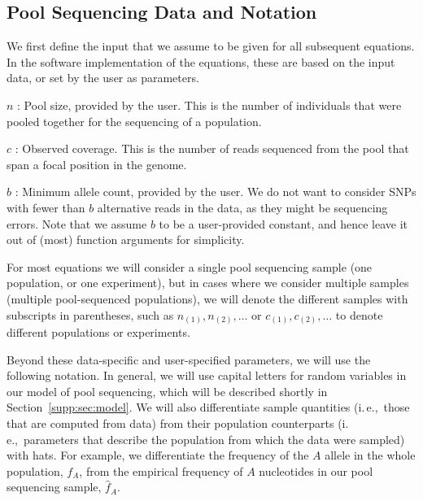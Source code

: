 \documentclass[letterpaper,fontsize=9pt,DIV=12]{scrartcl}
\newcounter{todo}
\newcommand\todo[1]{}
\newcommand\secref[1]{Section~\ref{#1}}
\newcommand{\samplesize}{n}
\newcommand{\coverage}{c}
\newcommand{\empfreq}{\widehat{f}}
\newcommand{\ie}{i.\,e.,~}
\begin{document}
\subsection{Pool Sequencing Data and Notation}
\label{supp:sec:Definitions:sub:PoolSequencing}

We first define the input that we assume to be given for all subsequent equations.
In the software implementation of the equations, these are based on the input data, or set by the user as parameters.

$\samplesize$ :
Pool size, provided by the user. This is the number of individuals that were pooled together for the sequencing of a population.

$\coverage$ :
Observed coverage. This is the number of reads sequenced from the pool that span a focal position in the genome. 

$b$ :
Minimum allele count, provided by the user.
We do not want to consider SNPs with fewer than $b$ alternative reads in the data, as they might be sequencing errors.
Note that we assume $b$ to be a user-provided constant,
and hence leave it out of (most) function arguments for simplicity.

For most equations we will consider a single pool sequencing sample (one population, or one experiment), but in cases where we consider multiple samples (multiple pool-sequenced populations), we will denote the different samples with subscripts in parentheses, such as $\samplesize_{(1)}, \samplesize_{(2)},\ldots$ or $\coverage_{(1)}, \coverage_{(2)}, \ldots$ to denote different populations or experiments.

Beyond these data-specific and user-specified parameters, we will use the following notation.  In general, we will use capital letters for random variables in our model of pool sequencing, which will be described shortly in \secref{supp:sec:model}.  We will also differentiate sample quantities (\ie those that are computed from data) from their population counterparts (\ie parameters that describe the population from which the data were sampled) with hats.  For example, we differentiate the frequency of the $A$ allele in the whole population, $f_A$, from the empirical frequency of $A$ nucleotides in our pool sequencing sample, $\empfreq_A$.
\end{document}
